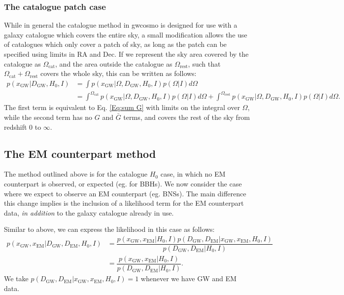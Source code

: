 \documentclass[a4paper,10pt]{article}
\begin{document}
\subsubsection{The catalogue patch case}
While in general the catalogue method in gwcosmo is designed for use with a galaxy catalogue which covers the entire sky, a small modification allows the use of catalogues which only cover a patch of sky, as long as the patch can be specified using limits in RA and Dec.  If we represent the sky area covered by the catalogue as $\Omega_{\text{cat}}$, and the area outside the catalogue as $\Omega_{\text{rest}}$, such that $\Omega_{\text{cat}}+\Omega_{\text{rest}}$ covers the whole sky, this can be written as follows:
\begin{equation}
\begin{aligned}
p(x_{\text{GW}}|D_{\text{GW}},H_0,I) &= \int p(x_{\text{GW}}|\Omega,D_{\text{GW}},H_0,I)p(\Omega|I) d\Omega
\\&=  \int^{\Omega_{\text{cat}}} p(x_{\text{GW}}|\Omega,D_{\text{GW}},H_0,I)p(\Omega|I) d\Omega + \int^{\Omega_{\text{rest}}}p(x_{\text{GW}}|\Omega,D_{\text{GW}},H_0,I)p(\Omega|I) d\Omega.
\end{aligned} 
\end{equation}
The first term is equivalent to Eq. \ref{Eq:sum G} with limits on the integral over $\Omega$, while the second term has no $G$ and $\bar{G}$ terms, and covers the rest of the sky from redshift 0 to $\infty$.


\subsection{The EM counterpart method}
The method outlined above is for the catalogue $H_0$ case, in which no EM counterpart is observed, or expected (eg. for BBHs).  We now consider the case where we expect to observe an EM counterpart (eg. BNSs).  The main difference this change implies is the inclusion of a likelihood term for the EM counterpart data, \emph{in addition} to the galaxy catalogue already in use.

Similar to above, we can express the likelihood in this case as follows:
\begin{equation}
\begin{aligned}
p(x_{\text{GW}},x_{\text{EM}}|D_{\text{GW}},D_{\text{EM}},H_0,I) &= \dfrac{p(x_{\text{GW}},x_{\text{EM}}|H_0,I) p(D_{\text{GW}},D_{\text{EM}}|x_{\text{GW}},x_{\text{EM}},H_0,I)}{p(D_{\text{GW}},D_{\text{EM}}|H_0,I)}
\\&= \dfrac{p(x_{\text{GW}},x_{\text{EM}}|H_0,I)}{p(D_{\text{GW}},D_{\text{EM}}|H_0,I)}.
\end{aligned} 
\end{equation}
We take $p(D_{\text{GW}},D_{\text{EM}}|x_{\text{GW}},x_{\text{EM}},H_0,I)=1$ whenever we have GW and EM data.
\end{document}
